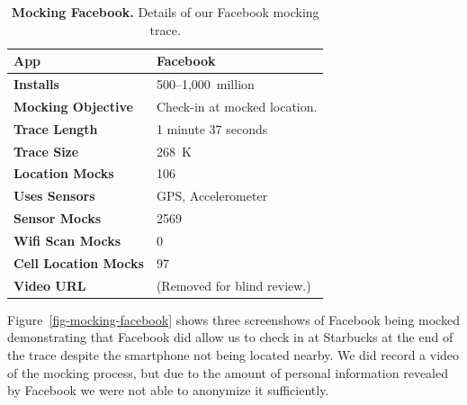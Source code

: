 \begin{table}[t]
\begin{tabularx}{3.33in}{lX}
\textbf{App} & Facebook \\ \toprule
\textbf{Installs} & 500--1,000~million \\
\textbf{Mocking Objective} & Check-in at mocked location. \\
  \midrule
\textbf{Trace Length} & 1 minute 37 seconds \\
\textbf{Trace Size} & 268~K \\
\textbf{Location Mocks} & 106 \\
\textbf{Uses Sensors} & GPS, Accelerometer \\
\textbf{Sensor Mocks} & 2569 \\
\textbf{Wifi Scan Mocks} & 0 \\
\textbf{Cell Location Mocks} & 97 \\
\textbf{Video URL} & (Removed for blind review.) \\

\end{tabularx}

\caption{\textbf{Mocking Facebook.} Details of our Facebook mocking trace.}

\label{table-mocking-facebook}

\end{table}

Figure~\ref{fig-mocking-facebook} shows three screenshows of Facebook being
mocked demonstrating that Facebook did allow us to check in at Starbucks at
the end of the trace despite the smartphone not being located nearby. We did
record a video of the mocking process, but due to the amount of personal
information revealed by Facebook we were not able to anonymize it
sufficiently.

